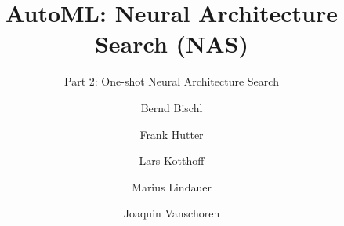 
\usepackage{amssymb}
\usepackage{wrapfig}
\newcommand{\argminA}{\mathop{\mathrm{argmin}}}

\newcommand{\videotitle}[1]{\subtitle{#1}}

\title[AutoML: NAS]{AutoML: Neural Architecture Search (NAS)} %
\subtitle{Part 2: One-shot Neural Architecture Search} %
\author[Marius Lindauer]{Bernd Bischl \and \underline{Frank Hutter} \and Lars Kotthoff\newline \and Marius Lindauer \and Joaquin Vanschoren}
\institute{}
\date{}

\AtBeginSection[]{}

\renewcommand{\videotitle}[1]{\subtitle{#1}\section{#1}}

	
\maketitle

\newcommand{\lecturetitle}{Neural Architecture Search (NAS)}









